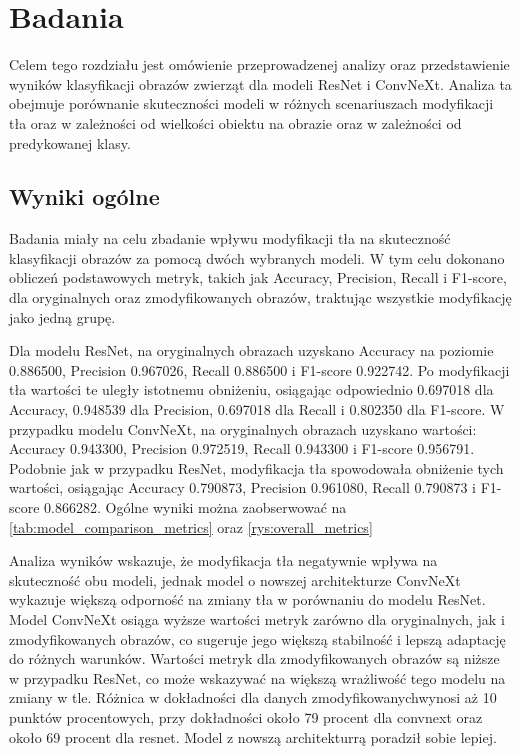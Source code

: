 \chapter*{Badania}

Celem tego rozdziału jest omówienie przeprowadzenej analizy oraz przedstawienie wyników klasyfikacji obrazów zwierząt dla modeli ResNet i ConvNeXt. Analiza ta obejmuje porównanie skuteczności modeli w różnych scenariuszach modyfikacji tła 
oraz w zależności od wielkości obiektu na obrazie oraz w zależności od predykowanej klasy.

\section*{Wyniki ogólne}

Badania miały na celu zbadanie wpływu modyfikacji tła na skuteczność klasyfikacji obrazów za pomocą dwóch wybranych modeli. W tym celu dokonano obliczeń podstawowych metryk, takich jak Accuracy, Precision, Recall i F1-score, dla oryginalnych 
oraz zmodyfikowanych obrazów, traktując wszystkie modyfikację jako jedną grupę.

Dla modelu ResNet, na oryginalnych obrazach uzyskano Accuracy na poziomie 0.886500, Precision 0.967026, Recall 0.886500 i F1-score 0.922742. Po modyfikacji tła wartości te uległy istotnemu obniżeniu, osiągając odpowiednio 0.697018 dla 
Accuracy, 0.948539 dla Precision, 0.697018 dla Recall i 0.802350 dla F1-score. W przypadku modelu ConvNeXt, na oryginalnych obrazach uzyskano wartości: Accuracy 0.943300, Precision 0.972519, Recall 0.943300 i F1-score 0.956791. Podobnie jak 
w przypadku ResNet, modyfikacja tła spowodowała obniżenie tych wartości, osiągając Accuracy 0.790873, Precision 0.961080, Recall 0.790873 i F1-score 0.866282. Ogólne wyniki można zaobserwować na \ref*{tab:model_comparison_metrics} oraz \ref*{rys:overall_metrics}

Analiza wyników wskazuje, że modyfikacja tła negatywnie wpływa na skuteczność obu modeli, jednak model o nowszej architekturze ConvNeXt wykazuje większą odporność na zmiany tła w porównaniu do modelu ResNet. Model ConvNeXt osiąga wyższe 
wartości metryk zarówno dla oryginalnych, jak i zmodyfikowanych obrazów, co sugeruje jego większą stabilność i lepszą adaptację do różnych warunków. Wartości metryk dla zmodyfikowanych obrazów są niższe w przypadku ResNet, co może 
wskazywać na większą wrażliwość tego modelu na zmiany w tle. Różnica w dokładności dla danych zmodyfikowanychwynosi aż 10 punktów procentowych, przy dokładności około 79 procent dla convnext oraz około 69 procent dla resnet. Model 
z nowszą architekturrą poradził sobie lepiej.

